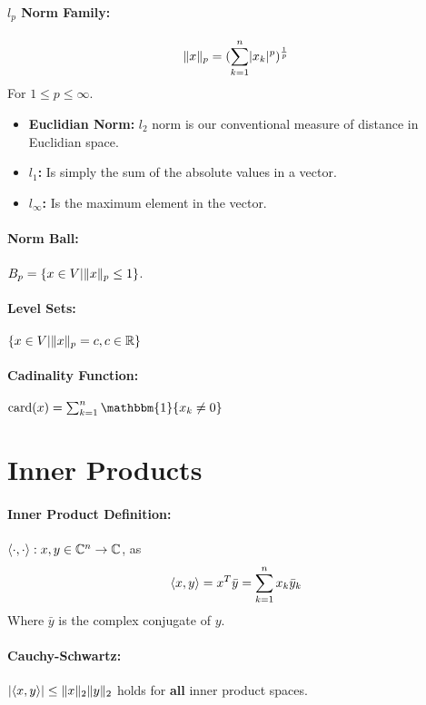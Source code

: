\documentclass[a4paper,12pt]{report}
\DeclarePairedDelimiter\abs{\lvert}{\rvert}%
\DeclarePairedDelimiter\norm{\lVert}{\rVert}%
\DeclarePairedDelimiter\inpr{\langle}{\rangle}%
\def\reals{\mathbb{R}}
\begin{document}
\paragraph{$l_p$ Norm Family: } \begin{equation}
\norm{x}_p = (\sum_{k=1}^{n} \abs{x_k}^p)^{\frac{1}{p}}
\end{equation}
For $1 \leq p \leq \infty$.

\begin{itemize}
\item \textbf{Euclidian Norm: } $l_2$ norm is our conventional measure of distance in Euclidian space.
\item \textbf{$l_1$: } Is simply the sum of the absolute values in a vector.
\item \textbf{$l_\infty$: } Is the maximum element in the vector.
\end{itemize}

\paragraph{Norm Ball: } $B_p = \{x\in V | \norm{x}_p \leq 1\}$.

\paragraph{Level Sets: } $\{x\in V | \norm{x}_p = c, c\in\reals\}$

\paragraph{Cadinality Function: } $\text{card}(x) = \sum_{k=1}^{n} \mathbbm{1}\{x_k \neq 0\}$



\section{Inner Products}

\paragraph{Inner Product Definition: } $\inpr{\cdot,\cdot}: x, y\in\mathbb{C}^n \to \mathbb{C}$, as \begin{equation}
\inpr{x, y} = x^T\bar{y} = \sum_{k=1}^{n} x_k \bar{y}_k
\end{equation}
Where $\bar{y}$ is the complex conjugate of $y$.


\paragraph{Cauchy-Schwartz: } $\abs{\inpr{x, y}} \leq \norm{x}_2 \norm{y}_2$ holds for \textbf{all} inner product spaces.
\end{document}
